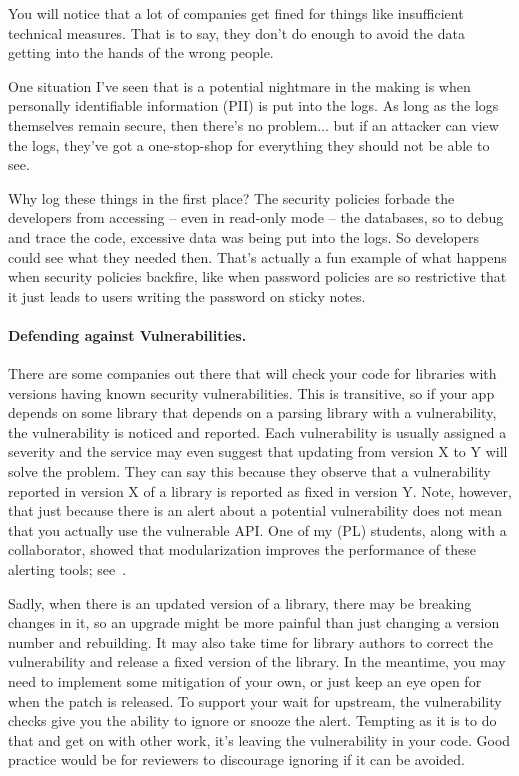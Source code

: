 You will notice that a lot of companies get fined for things like insufficient technical measures. That is to say, they don't do enough to avoid the data getting into the hands of the wrong people.

One situation I've seen that is a potential nightmare in the making is when personally identifiable information (PII) is put into the logs. As long as the logs themselves remain secure, then there's no problem... but if an attacker can view the logs, they've got a one-stop-shop for everything they should not be able to see.

Why log these things in the first place? The security policies forbade the developers from accessing -- even in read-only mode -- the databases, so to debug and trace the code, excessive data was being put into the logs. So developers could see what they needed then. That's actually a fun example of what happens when security policies backfire, like when password policies are so restrictive that it just leads to users writing the password on sticky notes.


\paragraph{Defending against Vulnerabilities.}
There are some companies out there that will check your code for libraries with versions having known security vulnerabilities. This is transitive, so if your app depends on some library that depends on a parsing library with a vulnerability, the vulnerability is noticed and reported. Each vulnerability is usually assigned a severity and the service may even suggest that updating from version X to Y will solve the problem. They can say this because they observe that a vulnerability reported in version X of a library is reported as fixed in version Y. Note, however, that just because there is an alert about a potential vulnerability does not mean that you actually use the vulnerable API. One of my (PL) students, along with a collaborator, showed that modularization improves the performance of these alerting tools; see~\cite{abdollahpour24:_enhan_secur_modul}.

Sadly, when there is an updated version of a library, there may be breaking changes in it, so an upgrade might be more painful than just changing a version number and rebuilding. It may also take time for library authors to correct the vulnerability and release a fixed version of the library. In the meantime, you may need to implement some mitigation of your own, or just keep an eye open for when the patch is released. To support your wait for upstream, the vulnerability checks give you the ability to ignore or snooze the alert. Tempting as it is to do that and get on with other work, it's leaving the vulnerability in your code. Good practice would be for reviewers to discourage ignoring if it can be avoided.

